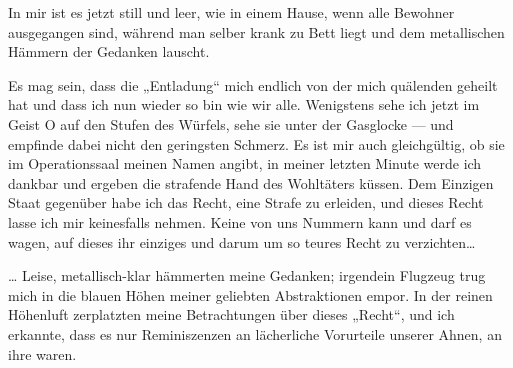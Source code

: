 In mir ist es jetzt
still und leer, wie in einem Hause, wenn alle Bewohner ausgegangen
sind, während man selber krank zu Bett liegt und dem metallischen
Hämmern der Gedanken lauscht.

Es mag sein, dass die „Entladung“ mich endlich von der mich
quälenden  geheilt hat und dass ich nun wieder so bin wie wir
alle. Wenigstens sehe ich jetzt im Geist O auf den Stufen des
Würfels, sehe sie unter der Gasglocke — und empfinde dabei nicht
den geringsten Schmerz. Es ist mir auch gleichgültig, ob sie im
Operationssaal meinen Namen angibt, in meiner letzten Minute werde
ich dankbar und ergeben die strafende Hand des Wohltäters küssen.
Dem Einzigen Staat gegenüber habe ich das Recht, eine Strafe zu
erleiden, und dieses Recht lasse ich mir keinesfalls nehmen. Keine
von uns Nummern kann und darf es wagen, auf dieses ihr einziges und
darum um so teures Recht zu verzichten\ldots{}

\ldots{} Leise,
metallisch-klar hämmerten meine Gedanken; irgendein Flugzeug trug
mich in die blauen Höhen meiner geliebten Abstraktionen empor. In
der reinen Höhenluft zerplatzten meine Betrachtungen über dieses
„Recht“, und ich erkannte, dass es nur Reminiszenzen an lächerliche
Vorurteile unserer Ahnen, an ihre  waren.

